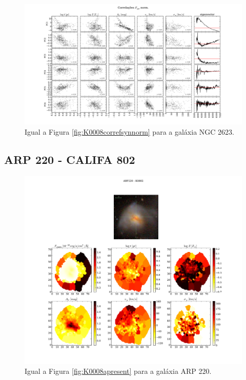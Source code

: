 \begin{figure}
    \includegraphics[width=1.3\textwidth, angle=-90]{figuras/K0213-correl-f_syn_norm-PCvsPhys.pdf}
	\caption[Correlações PCs vs. par\^ametros f\'isicos - $F_{syn}$ norm. - NGC 2623.]
	{Igual a Figura \ref{fig:K0008correfsynnorm} para a galáxia NGC 2623.}
    \label{fig:K0213correfsynnorm}
\end{figure}

\subsection{ARP 220 - CALIFA 802}

\begin{figure}
    \includegraphics[width=1.\textwidth]{figuras/K0802-apresent.pdf}
    \caption[Propriedades f\'isicas da gal\'axia ARP 220.]
    {Igual a Figura \ref{fig:K0008apresent} para a galáxia ARP 220.}
    \label{fig:K0802apresent}
\end{figure}

